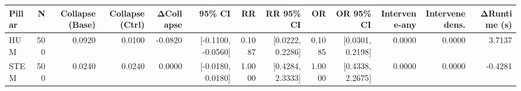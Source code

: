 \begin{table}[t]
\small
\centering
\begin{tabular}{lrrrrrrrrrrrr}
\toprule
Pillar & N & Collapse (Base) & Collapse (Ctrl) & ΔCollapse & 95\% CI & RR & RR 95\% CI & OR & OR 95\% CI & Intervene-any & Intervene dens. & ΔRuntime (s) \\
\midrule
HUM & 500 & 0.0920 & 0.0100 & -0.0820 & [-0.1100, -0.0560] & 0.1087 & [0.0222, 0.2286] & 0.1085 & [0.0301, 0.2198] & 0.0000 & 0.0000 & 3.7137 \\
STEM & 500 & 0.0240 & 0.0240 & 0.0000 & [-0.0180, 0.0180] & 1.0000 & [0.4284, 2.3333] & 1.0000 & [0.4338, 2.2675] & 0.0000 & 0.0000 & -0.4281 \\
\bottomrule
\end{tabular}
\label{tab:table1}
\end{table}
